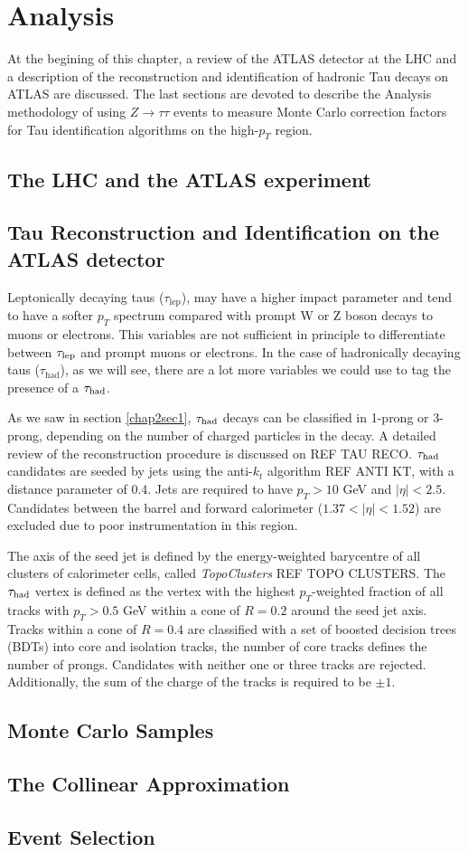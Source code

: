 \chapter{Analysis}\label{chap1}
At the begining of this chapter, a review of the ATLAS detector at the LHC and a description of the reconstruction and identification of hadronic Tau decays on ATLAS are discussed. The last sections are devoted to describe the Analysis methodology of using $Z\to\tau\tau$ events to measure Monte Carlo correction factors for Tau identification algorithms on the high-$p_T$ region.

\section{The LHC and the ATLAS experiment}

\section{Tau Reconstruction and Identification on the ATLAS detector}
Leptonically decaying taus ($\tau_\text{lep}$), may have a higher impact parameter and tend to have a softer $p_T$ spectrum compared with prompt W or Z boson decays to muons or electrons. This variables are not sufficient in principle to differentiate between $\tau_\text{lep}$ and prompt muons or electrons. In the case of hadronically decaying taus ($\tau_\text{had}$), as we will see, there are a lot more variables we could use to tag the presence of a $\tau_\text{had}$.

As we saw in section \ref{chap2sec1}, $\tau_\text{had}$ decays can be classified in 1-prong or 3-prong, depending on the number of charged particles in the decay. A detailed review of the reconstruction procedure is discussed on REF TAU RECO. $\tau_\text{had}$ candidates are seeded by jets using the anti-$k_t$ algorithm REF ANTI KT, with a distance parameter of 0.4. Jets are required to have $p_T>10$ GeV and $|\eta|<2.5$. Candidates between the barrel and forward calorimeter ($1.37<|\eta|<1.52$) are excluded due to poor instrumentation in this region.

The axis of the seed jet is defined by the energy-weighted barycentre of all clusters of calorimeter cells, called \textit{TopoClusters} REF TOPO CLUSTERS. The $\tau_\text{had}$ vertex is defined as the vertex with the highest $p_T$-weighted fraction of all tracks with $p_T>0.5$ GeV within a cone of $R=0.2$ around the seed jet axis. Tracks within a cone of $R=0.4$ are classified with a set of boosted decision trees (BDTs) into core and isolation tracks, the number of core tracks defines the number of prongs. Candidates with neither one or three tracks are rejected. Additionally, the sum of the charge of the tracks is required to be $\pm 1$.     

\section{Monte Carlo Samples}

\section{The Collinear Approximation}

\section{Event Selection}